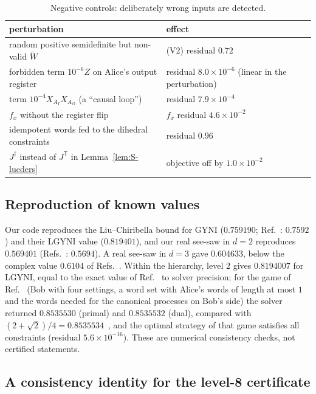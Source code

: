 \documentclass[aps,pra,onecolumn,notitlepage,superscriptaddress,longbibliography,nofootinbib,11pt]{revtex4-2}
\theoremstyle{remark}
\newcommand{\tp}{\mathsf{T}}
\begin{document}
\begin{table}[h]
\caption{Negative controls: deliberately wrong inputs are detected.}
\label{tab:S-neg}
\footnotesize
\begin{ruledtabular}
\begin{tabular}{ll}
perturbation & effect\\
\hline
random positive semidefinite but non-valid $\widetilde W$ & (V2) residual $0.72$\\
forbidden term $10^{-6}Z$ on Alice's output register & residual $8.0\times10^{-6}$ (linear in the perturbation)\\
term $10^{-4}X_{A_I}X_{A_O}$ (a ``causal loop'') & residual $7.9\times10^{-4}$\\
$f_x$ without the register flip & $f_x$ residual $4.6\times10^{-2}$\\
idempotent words fed to the dihedral constraints & residual $0.96$\\
$J^\dagger$ instead of $J^\tp$ in Lemma~\ref{lem:S-lueders} & objective off by $1.0\times10^{-2}$\\
\end{tabular}
\end{ruledtabular}
\end{table}

\subsection{Reproduction of known values}

Our code reproduces the Liu--Chiribella bound for GYNI ($0.759190$; Ref.~\cite{LiuChiribella2025}: $0.7592$) and their LGYNI value ($0.819401$), and our real see-saw in $d=2$ reproduces $0.569401$ (Refs.~\cite{Branciard2016,BoghiuSimonov2026}: $0.5694$). A real see-saw in $d=3$ gave $0.604633$, below the complex value $0.6104$ of Refs.~\cite{Branciard2016,BoghiuSimonov2026}. Within the hierarchy, level $2$ gives $0.8194007$ for LGYNI, equal to the exact value of Ref.~\cite{LiuChiribella2025} to solver precision; for the game of Ref.~\cite{Oreshkov2012} (Bob with four settings, a word set with Alice's words of length at most $1$ and the words needed for the canonical processes on Bob's side) the solver returned $0.8535530$ (primal) and $0.8535532$ (dual), compared with $(2+\sqrt2)/4=0.8535534$~\cite{LiuChiribella2025}, and the optimal strategy of that game satisfies all constraints (residual $5.6\times10^{-16}$). These are numerical consistency checks, not certified statements.

\subsection{A consistency identity for the level-8 certificate}
\end{document}
